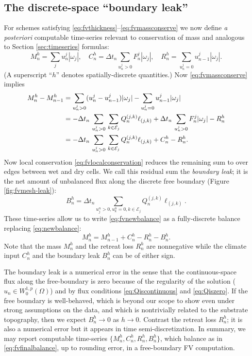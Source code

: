 \documentclass[final,onefignum]{siamart190516}
\begin{document}
\subsection{The discrete-space ``boundary leak''}  \label{subsec:leak}  For schemes satisfying \eqref{eq:fvthickness}--\eqref{eq:fvmassconserve} we now define \emph{a posteriori} computable time-series relevant to conservation of mass and analogous to Section \ref{sec:timeseries} formulas:
\begin{equation}
M_n^h = \sum_j u_n^j |\omega_j|, \quad C_n^h = \Delta t_n\!\!\sum_{u_n^j>0} F_n^j |\omega_j|, \quad R_n^h = \sum_{u_n^j=0} u_{n-1}^j |\omega_j|.  \label{eq:fvtimeseriesdefn}
\end{equation}
(A superscript ``$h$'' denotes spatially-discrete quantities.)  Now \eqref{eq:fvmassconserve} implies
\begin{align}
M_n^h - M_{n-1}^h &= \sum_{u_n^j>0} (u_n^j - u_{n-1}^j) |\omega_j| - \sum_{u_n^j=0} u_{n-1}^j |\omega_j| \notag \\
   &= - \Delta t_n\,\sum_{u_n^j>0}\, \sum_{k\in\mathcal{E}_j} Q_n^{(j,k)} \ell_{(j,k)} + \Delta t_n\,\sum_{u_n^j>0} F_n^j |\omega_j| - R_n^h \notag \\
   &= - \Delta t_n\,\sum_{u_n^j>0}\, \sum_{k\in\mathcal{E}_j} Q_n^{(j,k)} \ell_{(j,k)} + C_n^h - R_n^h.  \label{eq:fvnewbalance}
\end{align}
Now local conservation \eqref{eq:fvlocalconservation} reduces the remaining sum to over edges between wet and dry cells.  We call this residual sum the \emph{boundary leak}; it is the net amount of unbalanced flux along the discrete free boundary (Figure \ref{fig:fvmesh-leak}):
\begin{equation}
B_n^h = \Delta t_n \sum_{u_j^n > 0, u_k^n = 0, k\in\mathcal{E}_j} Q_n^{(j,k)} \ell_{(j,k)}. \label{eq:fvdefineleak}
\end{equation}
These time-series allow us to write \eqref{eq:fvnewbalance} as a fully-discrete balance replacing \eqref{eq:newbalance}:
\begin{equation}
  M_n^h = M_{n-1}^h + C_n^h - R_n^h - B_n^h. \label{eq:fvfinalbalance}
\end{equation}
Note that the mass $M_n^h$ and the retreat loss $R_n^h$ are nonnegative while the climate input $C_n^h$ and the boundary leak $B_n^h$ can be of either sign.

The boundary leak is a numerical error in the sense that the continuous-space flux along the free-boundary is zero because of the regularity of the solution ($u_n \in W_0^{1,p}(\Omega)$) and by flux conditions \eqref{eq:Qiscontinuous} and \eqref{eq:Qiszero}.  If the free boundary is well-behaved, which is beyond our scope to show even under strong assumptions on the data, and which is nontrivially related to the substrate topography, then we expect $B_n^h\to 0$ as $h\to 0$.  Contrast the retreat loss $R_n^h$; it is also a numerical error but it appears in time semi-discretization.  In summary, we may report computable time-series $\{M_n^h,C_n^h,R_n^h,B_n^h\}$, which balance as in \eqref{eq:fvfinalbalance}, up to rounding error, in a free-boundary FV computation.
\end{document}
